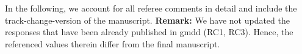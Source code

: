 In the following, we account for all referee comments in detail and include the track-change-version of the manuscript. {\bf Remark:} We have not updated the responses that have been already published in gmdd (RC1, RC3). Hence, the referenced values therein differ from the final manuscript.
\newpage



\newpage

%

